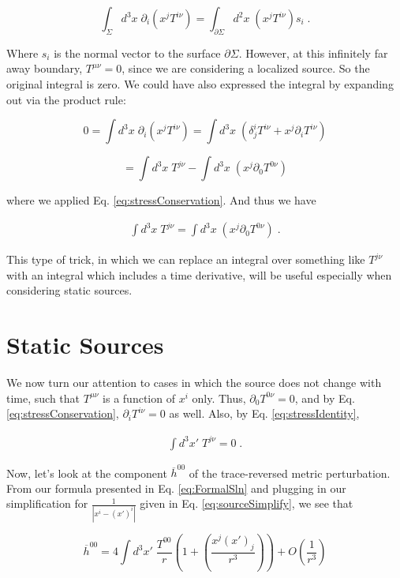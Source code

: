 \documentclass[10pt]{article}
\begin{document}
\[ \int_\Sigma d^3 x \; \partial_i (x^j T^{i\nu}) = \int_{\partial\Sigma} d^2 x \; (x^j T^{i\nu})s_i \; .\]
                
\noindent Where $s_i$ is the normal vector to the surface $\partial\Sigma$. However, at this infinitely far away boundary, $T^{\mu\nu} = 0$, since we are considering a localized source. So the original integral is zero. We could have also expressed the integral by expanding out via the product rule:
                
\[ 0 = \int d^3 x \; \partial_i (x^j T^{i\nu}) = \int d^3x \;\left( \delta^i_j T^{i\nu} + x^j \partial_i T^{i\nu} \right)\]
                
                
\[ = \int d^3 x \; T^{j\nu} - \int d^3 x \; (x^j \partial_0 T^{0\nu}) \]
                
where we applied Eq. \ref{eq:stressConservation}. And thus we have
                
\begin{align}\label{eq:stressIdentity}
\int d^3 x \; T^{j\nu} = \int d^3 x \; (x^j \partial_0 T^{0\nu}) \; .
\end{align}
                
This type of trick, in which we can replace an integral over something like $T^{j\nu}$ with an integral which includes a time derivative, will be useful especially when considering static sources.
             
\section{Static Sources}
We now turn our attention to cases in which the source does not change with time, such that $T^{\mu\nu}$ is a function of $x^i$ only. Thus, $\partial_0 T^{0\nu} = 0$, and by Eq. \ref{eq:stressConservation}, $\partial_i T^{i\nu} = 0$ as well. Also, by Eq. \ref{eq:stressIdentity}, 

\begin{align}\label{eq:Tidentity}
\int d^3 x' \; T^{j\nu} = 0 \; .
\end{align}

Now, let's look at the component $\overline{h}^{00}$ of the trace-reversed metric perturbation. From our formula presented in Eq. \ref{eq:FormalSln} and plugging in our simplification for $\frac{1}{|x^i-(x')^i|}$ given in Eq. \ref{eq:sourceSimplify}, we see that

\[ \overline{h}^{00} = 4 \int d^3x' \; \frac{T^{00}}{r} \left( 1 + \left( \frac{x^j(x')_j}{r^3} \right) \right) + O\left(\frac{1}{r^3}\right)\]
\end{document}
